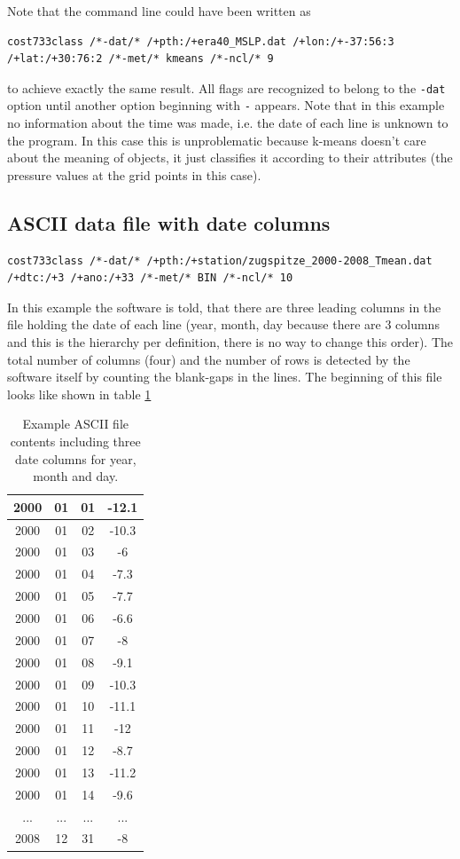 \documentclass[12pt, oneside, a4paper, headsepline, plainheadsepline]{scrbook}
\begin{document}
Note that the command line could have been written as
\begin{lstlisting}
cost733class /*-dat/* /+pth:/+era40_MSLP.dat /+lon:/+-37:56:3 /+lat:/+30:76:2 /*-met/* kmeans /*-ncl/* 9
\end{lstlisting}
to achieve exactly the same result. All flags are recognized to belong to the \verb+-dat+ option until another
option beginning with \verb+-+ appears.
Note that in this example no information about the time was made, i.e. the date of each line is unknown to the program.
In this case this is unproblematic because k-means doesn't care about the meaning of objects, it just classifies it 
according to their attributes (the pressure values at the grid points in this case).

\subsection{ASCII data file with date columns}
\begin{lstlisting}
cost733class /*-dat/* /+pth:/+station/zugspitze_2000-2008_Tmean.dat /+dtc:/+3 /+ano:/+33 /*-met/* BIN /*-ncl/* 10
\end{lstlisting}
In this example the software is told, that there are three leading columns in the file holding the date of each line
(year, month, day because there are 3 columns and this is the hierarchy per definition, there is no way to change this order).
The total number of columns (four) and the number of rows is detected by the software itself by counting the blank-gaps in the lines.
The beginning of this file looks like shown in table \ref{asciidatadate}
\begin{table}
\label{asciidatadate} 
\begin{scriptsize}
\begin{tabular}{|c|c|c|c|}
\hline 2000 & 01 & 01 & -12.1 \\
\hline 2000 & 01 & 02 & -10.3 \\
\hline 2000 & 01 & 03 & -6 \\
\hline 2000 & 01 & 04 & -7.3 \\
\hline 2000 & 01 & 05 & -7.7 \\
\hline 2000 & 01 & 06 & -6.6 \\
\hline 2000 & 01 & 07 & -8 \\
\hline 2000 & 01 & 08 & -9.1 \\
\hline 2000 & 01 & 09 & -10.3 \\
\hline 2000 & 01 & 10 & -11.1 \\
\hline 2000 & 01 & 11 & -12 \\
\hline 2000 & 01 & 12 & -8.7\\
\hline 2000 & 01 & 13 & -11.2 \\
\hline 2000 & 01 & 14 & -9.6 \\
\hline ... & ... & ... & ... \\
\hline 2008 & 12 & 31 & -8 \\
\hline 
\end{tabular} 
\end{scriptsize}
\caption{Example ASCII file contents including three date columns for year, month and day.}
\end{table}
\end{document}

